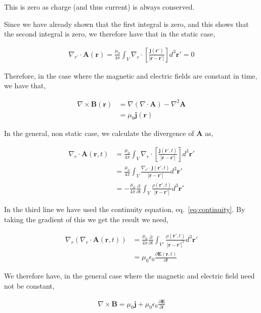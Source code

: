 \documentclass[11pt]{amsart}
\begin{document}
This is zero as charge (and thus current) is always conserved.

Since we have already shown that the first integral is zero, and this shows that the second integral is zero, we therefore have that in the static case,

\begin{align*}
  \nabla_{r'}\cdot\mathbf{A}(\mathbf{r}) = \frac{\mu_0}{4\pi}\int_V\nabla_r\cdot\left[\frac{\mathbf{j}(\mathbf{r'})}{|\mathbf{r}-\mathbf{r'}|}\right]d^3\mathbf{r'} = 0
\end{align*}

Therefore, in the case where the magnetic and electric fields are constant in time, we have that,

\begin{align*}
  \nabla\times\mathbf{B}(\mathbf{r})&=\nabla(\nabla\cdot\mathbf{A})-\nabla^2\mathbf{A} \\
  &=\mu_0\mathbf{j}(\mathbf{r})
\end{align*}

In the general, non static case, we calculate the divergence of $\mathbf{A}$ as,

\begin{align*}
  \nabla_r\cdot\mathbf{A}(\mathbf{r}, t)&=\frac{\mu_0}{4\pi}\int_V\nabla_r\cdot\left[\frac{\mathbf{j}(\mathbf{r'}, t)}{|\mathbf{r}-\mathbf{r'}|}\right]d^3\mathbf{r'} \\
  &=\frac{\mu_0}{4\pi}\int_V\frac{\nabla_{r'}\cdot\mathbf{j}(\mathbf{r'}, t)}{|\mathbf{r}-\mathbf{r'}|}d^3\mathbf{r'} \\
  &=-\frac{\mu_0}{4\pi}\frac{\partial}{\partial t}\int_V\frac{\rho(\mathbf{r'}, t)}{|\mathbf{r}-\mathbf{r'}|}d^3\mathbf{r'}
\end{align*}

In the third line we have used the continuity equation, eq.~\ref{eq:continuity}. By taking the gradient of this we get the result we need,

\begin{align*}
  \nabla_r\left(\nabla_r\cdot\mathbf{A}(\mathbf{r}, t)\right) &=\frac{\mu_0}{4\pi}\frac{\partial}{\partial t}\int_{V'}\frac{\rho(\mathbf{r'}, t)}{{|\mathbf{r}-\mathbf{r'}|}^3}d^3\mathbf{r'} \\
  &= \mu_0\epsilon_0\frac{\partial\mathbf{E}(\mathbf{r}, t)}{\partial t}
\end{align*}

We therefore have, in the general case where the magnetic and electric field need not be constant,

\begin{align*}
  \nabla\times\mathbf{B}=\mu_0\mathbf{j}+\mu_0\epsilon_0\frac{\partial\mathbf{E}}{\partial t}
\end{align*}
\end{document}
